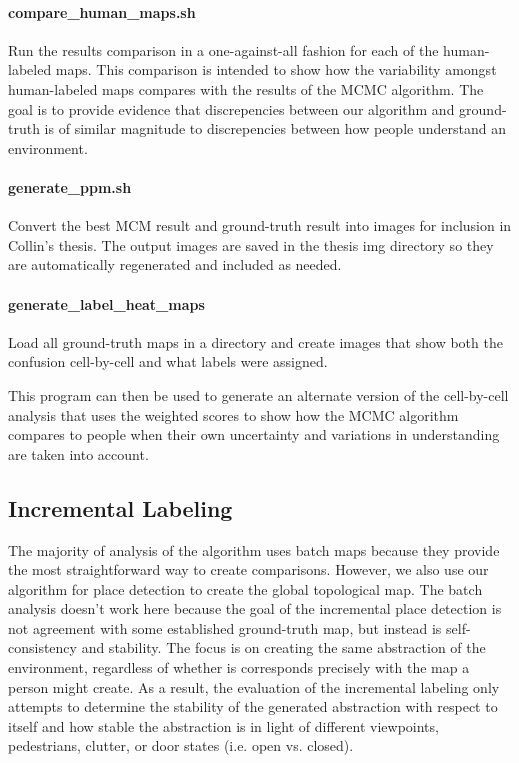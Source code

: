 \documentclass{article}
\begin{document}
\paragraph{compare\_human\_maps.sh}

Run the results comparison in a one-against-all fashion for each of the human-labeled maps. This comparison is
intended to show how the variability amongst human-labeled maps compares with the results of the MCMC algorithm.
The goal is to provide evidence that discrepencies between our algorithm and ground-truth is of similar magnitude
to discrepencies between how people understand an environment.

\paragraph{generate\_ppm.sh}

Convert the best MCM result and ground-truth result into images for inclusion in Collin's thesis. The output images
are saved in the thesis img directory so they are automatically regenerated and included as needed.

\paragraph{generate\_label\_heat\_maps}

Load all ground-truth maps in a directory and create images that show both the confusion cell-by-cell and what labels
were assigned.

This program can then be used to generate an alternate version of the cell-by-cell analysis that uses the weighted
scores to show how the MCMC algorithm compares to people when their own uncertainty and variations in understanding
are taken into account.

\subsection{Incremental Labeling}

The majority of analysis of the algorithm uses batch maps because they provide the most straightforward way to create
comparisons. However, we also use our algorithm for place detection to create the global topological map. The batch
analysis doesn't work here because the goal of the incremental place detection is not agreement with some established
ground-truth map, but instead is self-consistency and stability. The focus is on creating the same abstraction of the
environment, regardless of whether is corresponds precisely with the map a person might create. As a result, the
evaluation of the incremental labeling only attempts to determine the stability of the generated abstraction with
respect to itself and how stable the abstraction is in light of different viewpoints, pedestrians, clutter, or
door states (i.e. open vs. closed).
\end{document}

